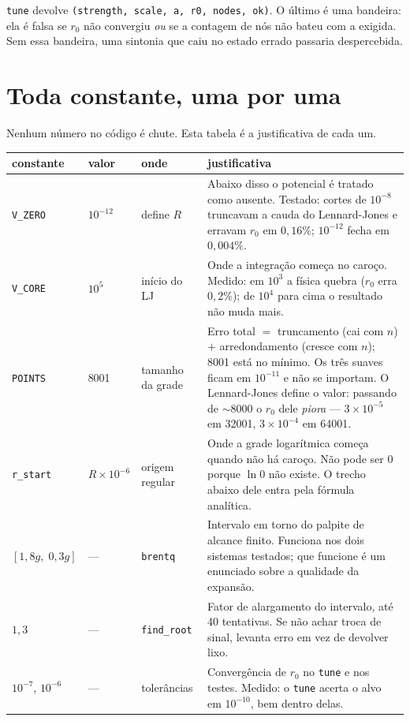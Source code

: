 \documentclass[11pt,a4paper]{article}
\begin{document}
\texttt{tune} devolve \texttt{(strength, scale, a, r0, nodes, ok)}. O último é
uma bandeira: ela é falsa se $r_0$ não convergiu \emph{ou} se a contagem de nós
não bateu com a exigida. Sem essa bandeira, uma sintonia que caiu no estado
errado passaria despercebida.

\section{Toda constante, uma por uma}

Nenhum número no código é chute. Esta tabela é a justificativa de cada um.

\begin{center}
\begin{tabular}{lll p{6.6cm}}
\toprule
\textbf{constante} & \textbf{valor} & \textbf{onde} & \textbf{justificativa} \\
\midrule
\texttt{V\_ZERO} & $10^{-12}$ & define $R$ &
  Abaixo disso o potencial é tratado como ausente. Testado: cortes de $10^{-8}$
  truncavam a cauda do Lennard-Jones e erravam $r_0$ em $0{,}16\%$; $10^{-12}$
  fecha em $0{,}004\%$. \\
\addlinespace
\texttt{V\_CORE} & $10^{5}$ & início do LJ &
  Onde a integração começa no caroço. Medido: em $10^{3}$ a física quebra
  ($r_0$ erra $0{,}2\%$); de $10^{4}$ para cima o resultado não muda mais. \\
\addlinespace
\texttt{POINTS} & 8001 & tamanho da grade &
  Erro total $=$ truncamento (cai com $n$) $+$ arredondamento (cresce com $n$);
  8001 está no mínimo. Os três suaves ficam em $10^{-11}$ e não se importam. O
  Lennard-Jones define o valor: passando de $\sim$8000 o $r_0$ dele \emph{piora}
  --- $3\times10^{-5}$ em 32001, $3\times10^{-4}$ em 64001. \\
\addlinespace
\texttt{r\_start} & $R\times10^{-6}$ & origem regular &
  Onde a grade logarítmica começa quando não há caroço. Não pode ser $0$ porque
  $\ln 0$ não existe. O trecho abaixo dele entra pela fórmula analítica. \\
\addlinespace
$[1{,}8g,\;0{,}3g]$ & --- & \texttt{brentq} &
  Intervalo em torno do palpite de alcance finito. Funciona nos dois sistemas
  testados; que funcione é um enunciado sobre a qualidade da expansão. \\
\addlinespace
$1{,}3$ & --- & \texttt{find\_root} &
  Fator de alargamento do intervalo, até 40 tentativas. Se não achar troca de
  sinal, levanta erro em vez de devolver lixo. \\
\addlinespace
$10^{-7}$, $10^{-6}$ & --- & tolerâncias &
  Convergência de $r_0$ no \texttt{tune} e nos testes. Medido: o \texttt{tune}
  acerta o alvo em $10^{-10}$, bem dentro delas. \\
\bottomrule
\end{tabular}
\end{center}
\end{document}
